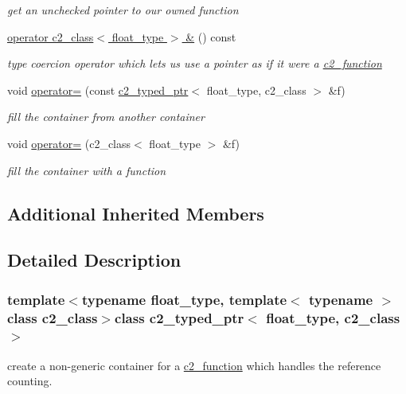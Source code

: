 \begin{DoxyCompactItemize}
\begin{DoxyCompactList}\small\item\em get an unchecked pointer to our owned function \end{DoxyCompactList}\item 
\hypertarget{classc2__typed__ptr_aaef9ba4ce05fd58753d6708a1137fce8}{\hyperlink{classc2__typed__ptr_aaef9ba4ce05fd58753d6708a1137fce8}{operator c2\-\_\-class$<$ float\-\_\-type $>$ \&} () const }\label{classc2__typed__ptr_aaef9ba4ce05fd58753d6708a1137fce8}

\begin{DoxyCompactList}\small\item\em type coercion operator which lets us use a pointer as if it were a \hyperlink{classc2__function}{c2\-\_\-function} \end{DoxyCompactList}\item 
void \hyperlink{classc2__typed__ptr_aaf609e847cb4478d3d545d17c9baf412}{operator=} (const \hyperlink{classc2__typed__ptr}{c2\-\_\-typed\-\_\-ptr}$<$ float\-\_\-type, c2\-\_\-class $>$ \&f)
\begin{DoxyCompactList}\small\item\em fill the container from another container \end{DoxyCompactList}\item 
void \hyperlink{classc2__typed__ptr_a4a2c9f95298686d210a5ce77a76a028e}{operator=} (c2\-\_\-class$<$ float\-\_\-type $>$ \&f)
\begin{DoxyCompactList}\small\item\em fill the container with a function \end{DoxyCompactList}\end{DoxyCompactItemize}
\subsection*{Additional Inherited Members}


\subsection{Detailed Description}
\subsubsection*{template$<$typename float\-\_\-type, template$<$ typename $>$ class c2\-\_\-class$>$class c2\-\_\-typed\-\_\-ptr$<$ float\-\_\-type, c2\-\_\-class $>$}

create a non-\/generic container for a \hyperlink{classc2__function}{c2\-\_\-function} which handles the reference counting. 

